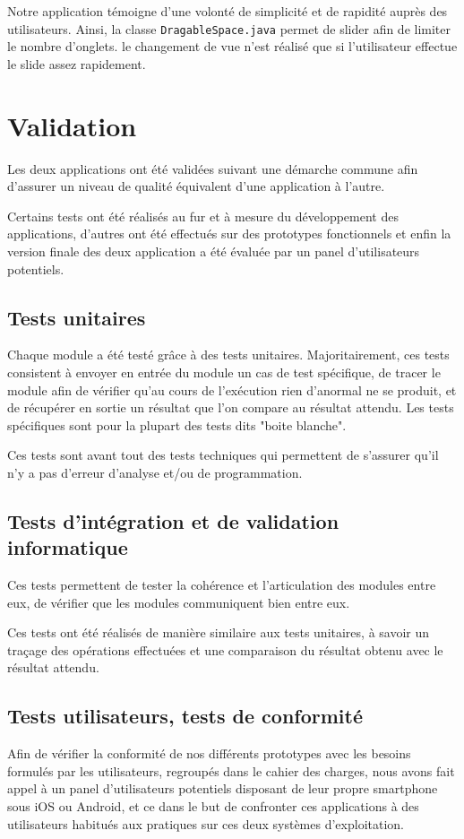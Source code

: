 \documentclass[a4paper, 11px]{article}
\begin{document}
Notre application témoigne d'une volonté de simplicité et de rapidité auprès des utilisateurs. Ainsi, la classe \texttt{DragableSpace.java} permet de \og slider \fg afin de limiter le nombre d'onglets. le changement de vue n'est réalisé que si l'utilisateur effectue le slide assez rapidement.



\section{Validation}
Les deux applications ont été validées suivant une démarche commune afin d'assurer un niveau de qualité équivalent d'une application à l'autre.

Certains tests ont été réalisés au fur et à mesure du développement des applications, d'autres ont été effectués sur des prototypes fonctionnels et enfin la version finale des deux application a été évaluée par un panel d'utilisateurs potentiels.

\subsection{Tests unitaires}
Chaque module a été testé grâce à des tests unitaires. Majoritairement, ces tests consistent à envoyer en entrée du module un cas de test spécifique, de tracer le module afin de vérifier qu'au cours de l’exécution rien d'anormal ne se produit, et de récupérer en sortie un résultat que l'on compare au résultat attendu. Les tests spécifiques sont pour la plupart des tests dits "boite blanche".

Ces tests sont avant tout des tests techniques qui permettent de s'assurer qu'il n'y a pas d'erreur d'analyse et/ou de programmation.

\subsection{Tests d'intégration et de validation informatique}
Ces tests permettent de tester la cohérence et l'articulation des modules entre eux, de vérifier que les modules communiquent bien entre eux.

Ces tests ont été réalisés de manière similaire aux tests unitaires, à savoir un traçage des opérations effectuées et une comparaison du résultat obtenu avec le résultat attendu.

\subsection{Tests utilisateurs, tests de conformité}
Afin de vérifier la conformité de nos différents prototypes avec les besoins formulés par les utilisateurs, regroupés dans le cahier des charges, nous avons fait appel à un panel d'utilisateurs potentiels disposant de leur propre smartphone sous iOS ou Android, et ce dans le but de confronter ces applications à des utilisateurs habitués aux pratiques sur ces deux systèmes d'exploitation.
\end{document}
